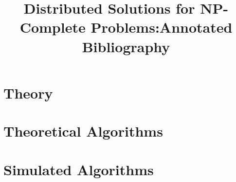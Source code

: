 

\bibliographyunit[\section]

\title{Distributed Solutions for NP-Complete Problems:Annotated Bibliography} 

\author{
}

\maketitle
\section{Theory}
\nocite{1011811}
\putbib
\section{Theoretical Algorithms}
\nocite{1378540}
\putbib
\section{Simulated Algorithms}
\nocite{978-3-540-77220-0_36}
\nocite{IPDPS.2008.45361}
\putbib

